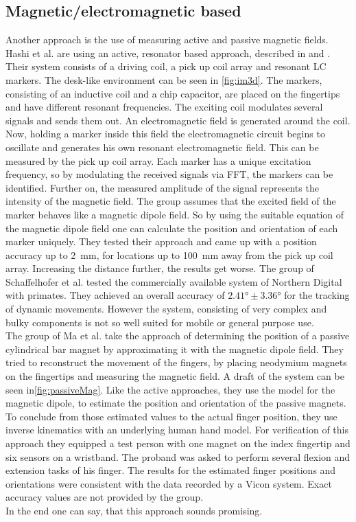 \subsection{Magnetic/electromagnetic based} \label{subsec:approaches:magnetic}
Another approach is the use of measuring active and passive magnetic fields.\\
Hashi et al. are using an active, resonator based approach, described in \cite{hashi2006wireless} and \cite{huang2014im3d}. Their system consists of a driving coil, a pick up coil array and resonant LC markers. The desk-like environment can be seen in \ref{fig:im3d}. The markers, consisting of an inductive coil and a chip capacitor, are placed on the fingertips and have different resonant frequencies. The exciting coil modulates several signals and sends them out. An electromagnetic field is generated around the coil. Now, holding a marker inside this field the electromagnetic circuit begins to oscillate and generates his own resonant electromagnetic field. This can be measured by the pick up coil array. Each marker has a unique excitation frequency, so by modulating the received signals via FFT, the markers can be identified. Further on, the measured amplitude of the signal represents the intensity of the magnetic field. The group assumes that the excited field of the marker behaves like a magnetic dipole field. So by using the suitable equation of the magnetic dipole field  one can calculate the position and orientation of each marker uniquely. They tested their approach and came up with a position accuracy up to \SI{2}{\mm}, for locations up to \SI{100}{mm} away from the pick up coil array. Increasing the distance further, the results get worse. The group of Schaffelhofer et al. tested the commercially available system of Northern Digital \cite{wave} with primates. They achieved an overall accuracy of $ \ang{2.41} \pm \ang{3.36} $ for the tracking of dynamic movements. However the system, consisting of very complex and bulky components is not so well suited for mobile or general purpose use.\\
The group of Ma et al. take the approach of determining the position of a passive cylindrical bar magnet by approximating it with the magnetic dipole field. They tried to reconstruct the movement of the fingers, by placing neodymium magnets on the fingertips and measuring the magnetic field. A draft of the system can be seen in\ref{fig:passiveMag}. Like the active approaches, they use the model for the magnetic dipole, to estimate the position and orientation of the passive magnets. To conclude from those estimated values to the actual finger position, they use inverse kinematics with an underlying human hand model. For verification of this approach they equipped a test person with one magnet on the index fingertip and six sensors on a wristband. The proband was asked to perform several flexion and extension tasks of his finger. The results for the estimated finger positions and orientations were consistent with the data recorded by a Vicon system. Exact accuracy values are not provided by the group.\\
In the end one can say, that this approach sounds promising. 

